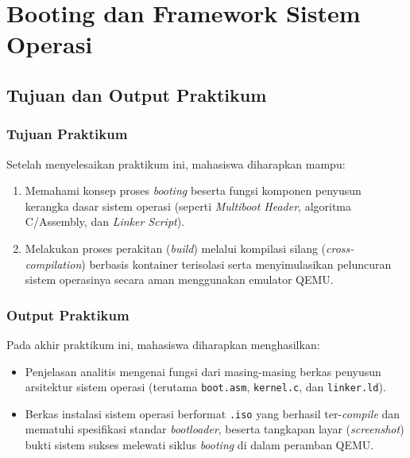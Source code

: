 
\chapter{Booting dan Framework Sistem Operasi}
\label{chap:modul-07}

\section{Tujuan dan Output Praktikum}

\subsection{Tujuan Praktikum}
Setelah menyelesaikan praktikum ini, mahasiswa diharapkan mampu:
\begin{enumerate}
	\item Memahami konsep proses \textit{booting} beserta fungsi komponen penyusun kerangka dasar sistem operasi (seperti \textit{Multiboot Header}, algoritma C/Assembly, dan \textit{Linker Script}).
	\item Melakukan proses perakitan (\textit{build}) melalui kompilasi silang (\textit{cross-compilation}) berbasis kontainer terisolasi serta menyimulasikan peluncuran sistem operasinya secara aman menggunakan emulator QEMU.
\end{enumerate}

\subsection{Output Praktikum}
Pada akhir praktikum ini, mahasiswa diharapkan menghasilkan:
\begin{itemize}
	\item Penjelasan analitis mengenai fungsi dari masing-masing berkas penyusun arsitektur sistem operasi (terutama \texttt{boot.asm}, \texttt{kernel.c}, dan \texttt{linker.ld}).
	\item Berkas instalasi sistem operasi berformat \texttt{.iso} yang berhasil ter-\textit{compile} dan mematuhi spesifikasi standar \textit{bootloader}, beserta tangkapan layar (\textit{screenshot}) bukti sistem sukses melewati siklus \textit{booting} di dalam peramban QEMU.
\end{itemize}

